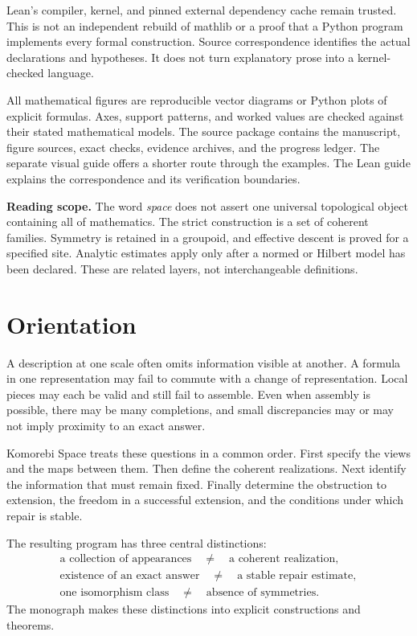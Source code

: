 \documentclass[11pt]{article}
\begin{document}
Lean's compiler, kernel, and pinned external dependency cache remain trusted. This is not an independent rebuild of mathlib or a proof that a Python program implements every formal construction. Source correspondence identifies the actual declarations and hypotheses. It does not turn explanatory prose into a kernel-checked language.

All mathematical figures are reproducible vector diagrams or Python plots of explicit formulas. Axes, support patterns, and worked values are checked against their stated mathematical models. The source package contains the manuscript, figure sources, exact checks, evidence archives, and the progress ledger. The separate visual guide offers a shorter route through the examples. The Lean guide explains the correspondence and its verification boundaries.

\begin{scopebox}
\textbf{Reading scope.} The word \emph{space} does not assert one universal topological object containing all of mathematics. The strict construction is a set of coherent families. Symmetry is retained in a groupoid, and effective descent is proved for a specified site. Analytic estimates apply only after a normed or Hilbert model has been declared. These are related layers, not interchangeable definitions.
\end{scopebox}

\clearpage
\section*{Orientation}
A description at one scale often omits information visible at another. A formula in one representation may fail to commute with a change of representation. Local pieces may each be valid and still fail to assemble. Even when assembly is possible, there may be many completions, and small discrepancies may or may not imply proximity to an exact answer.

Komorebi Space treats these questions in a common order. First specify the views and the maps between them. Then define the coherent realizations. Next identify the information that must remain fixed. Finally determine the obstruction to extension, the freedom in a successful extension, and the conditions under which repair is stable.

The resulting program has three central distinctions:
\[
\begin{gathered}
\text{a collection of appearances}\quad\ne\quad\text{a coherent realization},\\
\text{existence of an exact answer}\quad\ne\quad\text{a stable repair estimate},\\
\text{one isomorphism class}\quad\ne\quad\text{absence of symmetries}.
\end{gathered}
\]
The monograph makes these distinctions into explicit constructions and theorems.
\end{document}
